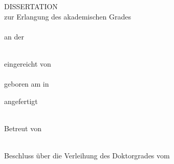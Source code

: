 \begin{titlepage}
\begin{center}

\null
\vspace{\baselineskip}
{\huge {\bfseries \tTitle \par}}
\vspace{5\baselineskip}
DISSERTATION \\
\vspace{\baselineskip}
zur Erlangung des akademischen Grades \\
\vspace{\baselineskip}
\tDegree \\
\vspace{\baselineskip}
an der\\ \vspace{.2\baselineskip}{\large \bf Medizinischen Fakultät der Universität Leipzig} \\
\vspace{6\baselineskip}

\vfill

    \noindent
    eingereicht von \\
    \vspace{.75\baselineskip}
    {\bf \tAuthor} \\
    \vspace{.25\baselineskip}
    geboren am \tBirthday{} in \tNativeTown \\

\vspace{3\baselineskip}

    \noindent
    angefertigt \InOderAm{\tDepartment} \\
    \tDepartment \\

\vspace{1.5\baselineskip}

    \noindent
    Betreut von \\
    \vspace{.5\baselineskip}
    \tSupervisor \\

\vspace{1.5\baselineskip}

    \noindent
    Beschluss über die Verleihung des Doktorgrades vom \tDefenceDate

\end{center}
\restoregeometry
\end{titlepage}

